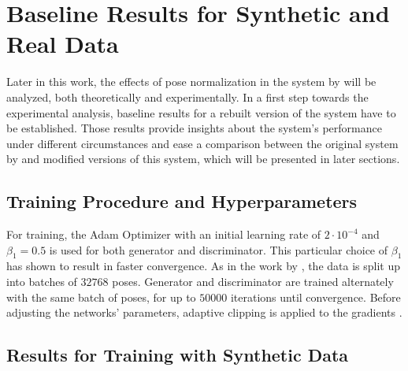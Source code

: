 \section{Baseline Results for Synthetic and Real Data}
\label{sec:evaluation}

Later in this work, the effects of pose normalization in the system by \citet{drover18} will be analyzed, both theoretically and experimentally.
In a first step towards the experimental analysis, baseline results for a rebuilt version of the system have to be established.
Those results provide insights about the system's performance under different circumstances and ease a comparison between the original system by \citet{drover18} and modified versions of this system, which will be presented in later sections.

\subsection{Training Procedure and Hyperparameters}
For training, the Adam Optimizer \cite{kingma17} with an initial learning rate of $2 \cdot 10^{-4}$ and $\beta_1 = 0.5$ is used for both generator and discriminator.
This particular choice of $\beta_1$ has shown to result in faster convergence.
As in the work by \citet{drover18}, the data is split up into batches of $32768$ poses.
Generator and discriminator are trained alternately with the same batch of poses, for up to $50000$ iterations until convergence.
Before adjusting the networks' parameters, adaptive clipping is applied to the gradients \cite[Section~3.2.1]{chorowski14}.


\subsection{Results for Training with Synthetic Data}
\label{sec:results-synthetic}

